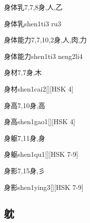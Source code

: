 \begin{Entry}{身体乳}{7,7,8}{⾝,⼈,⼄}
  \begin{Phonetics}{身体乳}{shen1ti3 ru3}
  \end{Phonetics}
\end{Entry}

\begin{Entry}{身体能力}{7,7,10,2}{⾝,⼈,⾁,⼒}
  \begin{Phonetics}{身体能力}{shen1ti3 neng2li4}
  \end{Phonetics}
\end{Entry}

\begin{Entry}{身材}{7,7}{⾝,⽊}
  \begin{Phonetics}{身材}{shen1cai2}[][HSK 4]
  \end{Phonetics}
\end{Entry}

\begin{Entry}{身高}{7,10}{⾝,⾼}
  \begin{Phonetics}{身高}{shen1gao1}[][HSK 4]
  \end{Phonetics}
\end{Entry}

\begin{Entry}{身躯}{7,11}{⾝,⾝}
  \begin{Phonetics}{身躯}{shen1qu1}[][HSK 7-9]
  \end{Phonetics}
\end{Entry}

\begin{Entry}{身影}{7,15}{⾝,⼺}
  \begin{Phonetics}{身影}{shen1ying3}[][HSK 7-9]
  \end{Phonetics}
\end{Entry}

\subsection*{躭}

